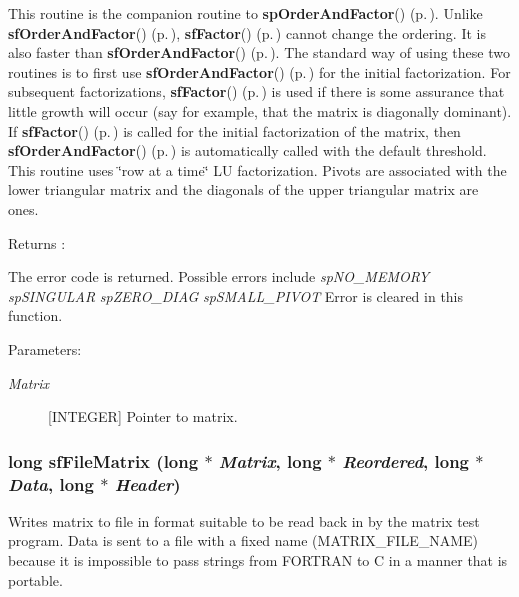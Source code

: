 This routine is the companion routine to {\bf sp\-Order\-And\-Factor}() {\rm (p.\,\pageref{spFactor_8c_a24})}. Unlike {\bf sf\-Order\-And\-Factor}() {\rm (p.\,\pageref{spFortran_8c_a61})}, {\bf sf\-Factor}() {\rm (p.\,\pageref{spFortran_8c_a62})} cannot change the ordering. It is also faster than {\bf sf\-Order\-And\-Factor}() {\rm (p.\,\pageref{spFortran_8c_a61})}. The standard way of using these two routines is to first use {\bf sf\-Order\-And\-Factor}() {\rm (p.\,\pageref{spFortran_8c_a61})} for the initial factorization. For subsequent factorizations, {\bf sf\-Factor}() {\rm (p.\,\pageref{spFortran_8c_a62})} is used if there is some assurance that little growth will occur (say for example, that the matrix is diagonally dominant). If {\bf sf\-Factor}() {\rm (p.\,\pageref{spFortran_8c_a62})} is called for the initial factorization of the matrix, then {\bf sf\-Order\-And\-Factor}() {\rm (p.\,\pageref{spFortran_8c_a61})} is automatically called with the default threshold. This routine uses \char`\"{}row at a time\char`\"{} LU factorization. Pivots are associated with the lower triangular matrix and the diagonals of the upper triangular matrix are ones.

\begin{Desc}
\item[Returns :]\par
[INTEGER or INTEGER$\ast$2] The error code is returned. Possible errors include {\em sp\-NO\_\-MEMORY} {\em sp\-SINGULAR} {\em sp\-ZERO\_\-DIAG} {\em sp\-SMALL\_\-PIVOT} Error is cleared in this function.\end{Desc}
\begin{Desc}
\item[Parameters: ]\par
\begin{description}
\item[{\em 
Matrix}][INTEGER] Pointer to matrix. \end{description}
\end{Desc}
\subsubsection{\setlength{\rightskip}{0pt plus 5cm}long sf\-File\-Matrix (long $\ast$ {\em Matrix}, long $\ast$ {\em Reordered}, long $\ast$ {\em Data}, long $\ast$ {\em Header})}\label{spFortran_8c_a67}


Writes matrix to file in format suitable to be read back in by the matrix test program. Data is sent to a file with a fixed name  (MATRIX\_\-FILE\_\-NAME) because it is impossible to pass strings from FORTRAN to C in a manner that is portable.

